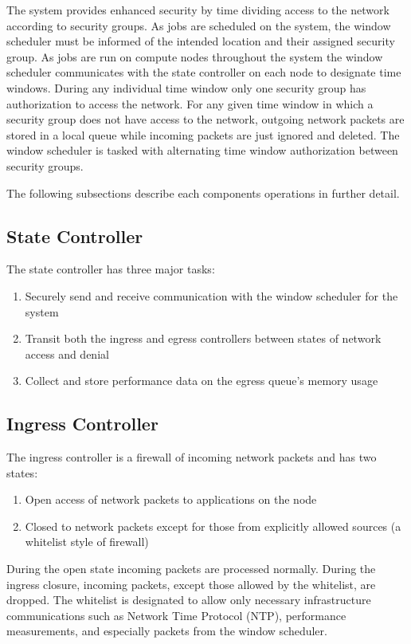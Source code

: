 \documentclass{article}
\begin{document}
The system provides enhanced security by time dividing access to the network according to security groups. As jobs are scheduled on the system, the window scheduler must be informed of the intended location and their assigned security group. As jobs are run on compute nodes throughout the system the window scheduler communicates with the state controller on each node to designate time windows. During any individual time window only one security group has authorization to access the network. For any given time window in which a security group does not have access to the network, outgoing network packets are stored in a local queue while incoming packets are just ignored and deleted. The window scheduler is tasked with alternating time window authorization between security groups.

The following subsections describe each components operations in further detail. 
\subsection{State Controller}
The state controller has three major tasks:
\begin{enumerate} \itemsep1pt \parskip0pt 
\item Securely send and receive communication with the window scheduler for the system
\item Transit both the ingress and egress controllers between states of network access and denial
\item Collect and store performance data on the egress queue's memory usage
\end{enumerate}

 

\subsection{Ingress Controller}
The ingress controller is a firewall of incoming network packets and has two states:
\begin{enumerate} \itemsep1pt \parskip0pt 
\item Open access of network packets to applications on the node
\item Closed to network packets except for those from explicitly allowed sources (a whitelist style of firewall)
\end{enumerate}


During the open state incoming packets are processed normally. During the ingress closure, incoming packets, except those allowed by the whitelist, are dropped. The whitelist is designated to allow only necessary infrastructure communications such as Network Time Protocol (NTP), performance measurements, and especially packets from the window scheduler.
\end{document}
